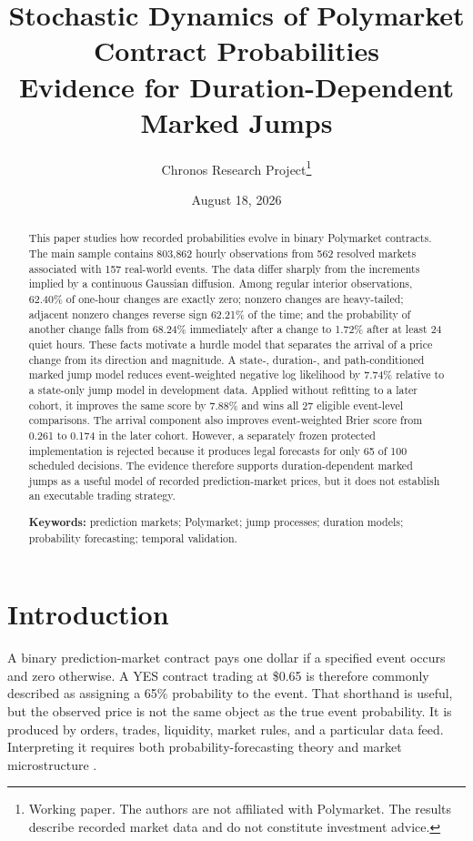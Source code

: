 \documentclass[11pt]{article}
\title{\textbf{Stochastic Dynamics of Polymarket Contract Probabilities}\\
\large Evidence for Duration-Dependent Marked Jumps}
\author{Chronos Research Project\thanks{Working paper. The authors are not affiliated with Polymarket. The results describe recorded market data and do not constitute investment advice.}}
\date{August 18, 2026}
\begin{document}
\maketitle

\begin{abstract}
This paper studies how recorded probabilities evolve in binary Polymarket contracts. The main
sample contains 803,862 hourly observations from 562 resolved markets associated with 157
real-world events. The data differ sharply from the increments implied by a continuous Gaussian
diffusion. Among regular interior observations, 62.40\% of one-hour changes are exactly zero;
nonzero changes are heavy-tailed; adjacent nonzero changes reverse sign 62.21\% of the time; and
the probability of another change falls from 68.24\% immediately after a change to 1.72\% after
at least 24 quiet hours. These facts motivate a hurdle model that separates the arrival of a
price change from its direction and magnitude. A state-, duration-, and path-conditioned marked
jump model reduces event-weighted negative log likelihood by 7.74\% relative to a state-only jump
model in development data. Applied without refitting to a later cohort, it improves the same
score by 7.88\% and wins all 27 eligible event-level comparisons. The arrival component also
improves event-weighted Brier score from 0.261 to 0.174 in the later cohort. However, a separately
frozen protected implementation is rejected because it produces legal forecasts for only 65 of
100 scheduled decisions. The evidence therefore supports duration-dependent marked jumps as a
useful model of recorded prediction-market prices, but it does not establish an executable
trading strategy.

\medskip
\noindent\textbf{Keywords:} prediction markets; Polymarket; jump processes; duration models;
probability forecasting; temporal validation.
\end{abstract}

\section{Introduction}

A binary prediction-market contract pays one dollar if a specified event occurs and zero
otherwise. A YES contract trading at \$0.65 is therefore commonly described as assigning a 65\%
probability to the event. That shorthand is useful, but the observed price is not the same object
as the true event probability. It is produced by orders, trades, liquidity, market rules, and a
particular data feed. Interpreting it requires both probability-forecasting theory and market
microstructure \cite{wolfers2004,manski2006,wolfers2006}.
\end{document}
